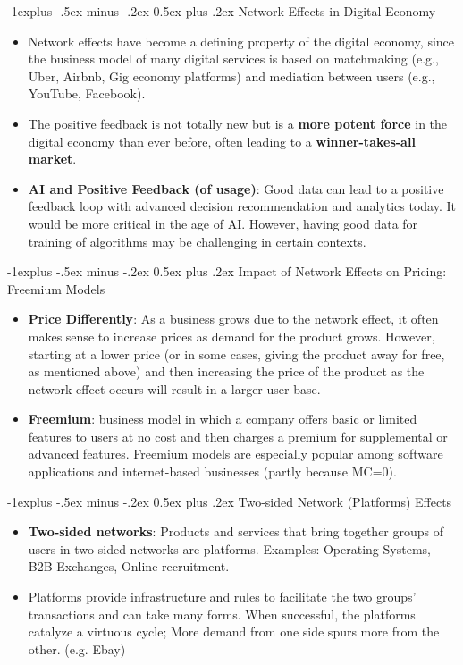 \documentclass[12pt, landscape]{article}
\makeatletter
\renewcommand{\subsection}{\@startsection{subsection}{2}{0mm}%
                                {-1explus -.5ex minus -.2ex}%
                                {0.5ex plus .2ex}%
                                {\normalfont\normalsize\bfseries}}
\makeatother
\begin{document}
\begin{multicols*}{3}
\subsection{Network Effects in Digital Economy}
\begin{itemize}
\item Network effects have become a defining property of the digital economy, since the business model of many digital services is based on matchmaking (e.g., Uber, Airbnb, Gig economy platforms) and mediation between users (e.g., YouTube, Facebook).
\item The positive feedback is not totally new but is a \textbf{more potent force} in the digital economy than ever before, often leading to a \textbf{winner-takes-all market}.
\item \textbf{AI and Positive Feedback (of usage)}: Good data can lead to a positive feedback loop with advanced decision recommendation and analytics today. It would be more critical in the age of AI. However, having good data for training of algorithms may be challenging in certain contexts.
\end{itemize}
\subsection{Impact of Network Effects on Pricing: Freemium Models}
\begin{itemize}
\item \textbf{Price Differently}: As a business grows due to the network effect, it often makes sense to increase prices as demand for the product grows. However, starting at a lower price (or in some cases, giving the product away for free, as mentioned above) and then increasing the price of the product as the network effect occurs will result in a larger user base.
\item \textbf{Freemium}: business model in which a company offers basic or limited features to users at no cost and then charges a premium for supplemental or advanced features. Freemium models are especially popular among software applications and internet-based businesses (partly because MC=0).
\end{itemize}
\subsection{Two-sided Network (Platforms) Effects}
\begin{itemize}
\item \textbf{Two-sided networks}: Products and services that bring together groups of users in two-sided networks are platforms. Examples: Operating Systems, B2B Exchanges, Online recruitment.
\item Platforms provide infrastructure and rules to facilitate the two groups’ transactions and can take many forms. When successful, the platforms catalyze a virtuous cycle; More demand from one side spurs more from the other. (e.g. Ebay)
\end{itemize}

\end{multicols*}
\end{document}
